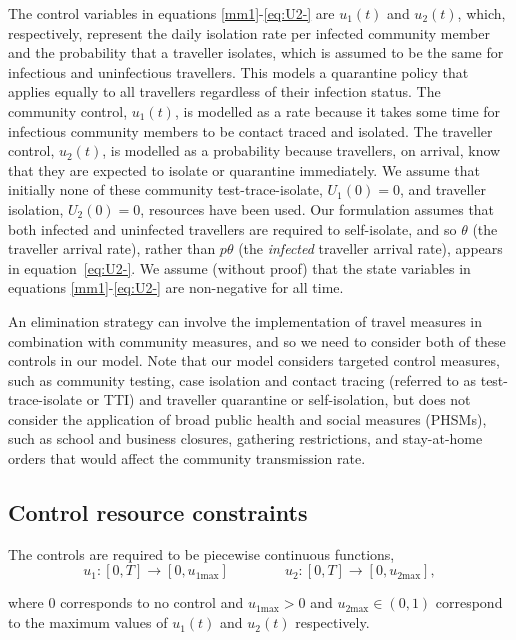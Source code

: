 \documentclass[pdflatex]{sn-jnl}
\theoremstyle{thmstyleone}%
\theoremstyle{thmstyletwo}%
\theoremstyle{thmstylethree}%
\begin{document}
The control variables in equations \eqref{mm1}-\eqref{eq:U2-} are $u_1(t)$ and $u_2(t)$, which, respectively, represent the daily isolation rate per infected community member and the probability that a traveller isolates, which is assumed to be the same for infectious and uninfectious travellers. This models a quarantine policy that applies equally to all travellers regardless of their infection status. The community control, $u_1(t)$, is modelled as a rate because it takes some time for infectious community members to be contact traced and isolated. The traveller control, $u_2(t)$, is modelled as a probability because travellers, on arrival, know that they are expected to isolate or quarantine immediately. We assume that initially none of these community test-trace-isolate, $U_1(0)=0$,  and traveller isolation, $U_2(0)=0$, resources have been used. Our formulation assumes that both infected and uninfected travellers are required to self-isolate, and so $\theta$ (the traveller arrival rate), rather than $p\theta$ (the \emph{infected} traveller arrival rate), appears in equation~\eqref{eq:U2-}. We assume (without proof) that the state variables in equations \eqref{mm1}-\eqref{eq:U2-} are non-negative for all time.

 An elimination strategy can involve the implementation of travel measures in combination with community measures, and so we need to consider both of these controls in our model. Note that our model considers targeted control measures, such as community testing, case isolation and contact tracing (referred to as test-trace-isolate or TTI) and traveller quarantine or self-isolation, but does not consider the application of broad public health and social measures (PHSMs), such as school and business closures, gathering restrictions, and stay-at-home orders that would affect the community transmission rate.

\subsection{Control resource constraints}\label{sec:constraints}
The controls are required to be piecewise continuous functions,
%
\[ u_1: [0,T] \rightarrow [0, u_{1\text{max}}] \qquad \qquad u_2: [0,T] \rightarrow [0, u_{2\text{max}}], \]

where $0$ corresponds to no control and $u_{1\text{max}}>0$ and $u_{2\text{max}} \in (0,1)$ correspond to the maximum values of $u_1(t)$ and $u_2(t)$ respectively.
\end{document}

